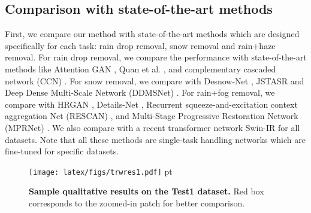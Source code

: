 \documentclass[10pt,twocolumn,letterpaper]{article}
\begin{document}
\subsection{Comparison with state-of-the-art methods}

First, we compare our method with state-of-the-art methods which are designed specifically for each task: rain drop removal, snow removal and rain+haze removal. For rain drop removal, we compare the performance with state-of-the-art methods like Attention GAN \cite{qian2018attentive}, Quan et al. \cite{quan2019deep}, and complementary cascaded network (CCN) \cite{quan2021removing}. For snow removal, we compare with Desnow-Net \cite{liu2018desnownet}, JSTASR \cite{chen2020jstasr} and  Deep Dense Multi-Scale Network (DDMSNet) \cite{zhang2021deep}. For rain+fog removal, we compare with HRGAN \cite{li2019heavy}, Details-Net \cite{fu2017removing}, Recurrent squeeze-and-excitation context aggregation
Net (RESCAN) \cite{li2018recurrent}, and Multi-Stage Progressive Restoration Network (MPRNet) \cite{zamir2021multi}. We also compare with a recent transformer network Swin-IR \cite{liang2021swinir} for all datasets. Note that all these methods are single-task handling networks which are fine-tuned for specific datasets.

\begin{figure*}[]
	\centering
	\texttt{[image: latex/figs/trwres1.pdf]}
	 pt
	\caption{\textbf{Sample qualitative results on the Test1 dataset.}  Red box corresponds to the zoomed-in patch for better comparison.  }
	\label{test1res}
	\vspace{-1.8em}
\end{figure*}
\end{document}
